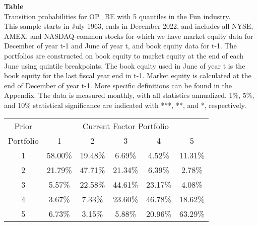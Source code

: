 \begin{table*}[ht!]
\raggedright
{}
\label{tab: transition_probs_OP_BE_Fun_with_5_quantiles}
\textbf{Table \thetable} \\
Transition probabilities for OP_BE with 5 quantiles in the Fun industry. \\
\hspace*{1em}This sample starts in July 1963, ends in December 2022, and includes all NYSE, AMEX, and NASDAQ common stocks for which we have market equity data for December of year t-1 and June of year t, and book equity data for t-1. The portfolios are constructed on book equity to market equity at the end of each June using quintile breakpoints.  The book equity used in June of year t is the book equity for the last fiscal year end in t-1.  Market equity is calculated at the end of December of year t-1.  More specific definitions can be found in the Appendix.  The data is measured monthly, with all statistics annualized.  1\%, 5\%, and 10\% statistical significance are indicated with ***, **, and *, respectively. \\
\vspace{0.5em}
\centering
\begin{adjustbox}{max width=\textwidth}
\begin{tabular}{@{}cccccc@{}}
\toprule
Prior & \multicolumn{5}{c}{Current Factor Portfolio} \\
Portfolio & 1 & 2 & 3 & 4 & 5 \\
\midrule
1 & 58.00\% & 19.48\% & 6.69\% & 4.52\% & 11.31\% \\
2 & 21.79\% & 47.71\% & 21.34\% & 6.39\% & 2.78\% \\
3 & 5.57\% & 22.58\% & 44.61\% & 23.17\% & 4.08\% \\
4 & 3.67\% & 7.33\% & 23.60\% & 46.78\% & 18.62\% \\
5 & 6.73\% & 3.15\% & 5.88\% & 20.96\% & 63.29\% \\
\bottomrule
\end{tabular}
\end{adjustbox}
\end{table*}